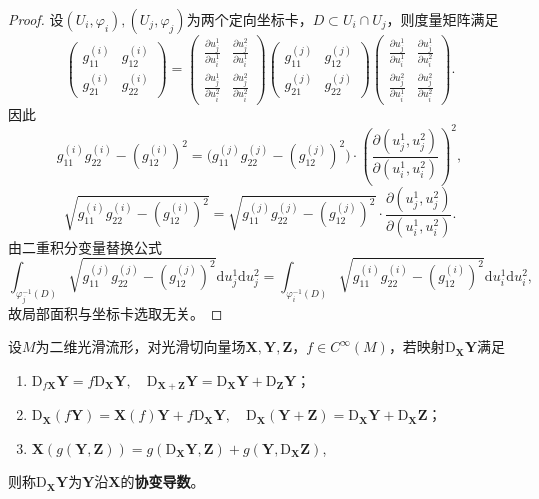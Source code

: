 \documentclass[../../main.tex]{subfiles}%
\begin{document}
\begin{proof}
设$(U_i,\varphi_i),(U_j,\varphi_j)$为两个定向坐标卡，$D\subset U_i\cap U_j$，则度量矩阵满足
\[
\begin{pmatrix}g_{11}^{(i)}&g_{12}^{(i)}\\g_{21}^{(i)}&g_{22}^{(i)}\end{pmatrix}
=\begin{pmatrix}\frac{\partial u_j^1}{\partial u_i^1}&\frac{\partial u_j^2}{\partial u_i^1}\\\frac{\partial u_j^1}{\partial u_i^2}&\frac{\partial u_j^2}{\partial u_i^2}\end{pmatrix}
\begin{pmatrix}g_{11}^{(j)}&g_{12}^{(j)}\\g_{21}^{(j)}&g_{22}^{(j)}\end{pmatrix}
\begin{pmatrix}\frac{\partial u_j^1}{\partial u_i^1}&\frac{\partial u_j^1}{\partial u_i^2}\\\frac{\partial u_j^2}{\partial u_i^1}&\frac{\partial u_j^2}{\partial u_i^2}\end{pmatrix}.
\]
因此
\[
g_{11}^{(i)}g_{22}^{(i)}-(g_{12}^{(i)})^2=\big(g_{11}^{(j)}g_{22}^{(j)}-(g_{12}^{(j)})^2\big)\cdot\left(\frac{\partial(u_j^1,u_j^2)}{\partial(u_i^1,u_i^2)}\right)^2,
\]
\[
\sqrt{g_{11}^{(i)}g_{22}^{(i)}-(g_{12}^{(i)})^2}=\sqrt{g_{11}^{(j)}g_{22}^{(j)}-(g_{12}^{(j)})^2}\cdot\frac{\partial(u_j^1,u_j^2)}{\partial(u_i^1,u_i^2)}.
\]
由二重积分变量替换公式
\[
\int_{\varphi_j^{-1}(D)}\sqrt{g_{11}^{(j)}g_{22}^{(j)}-(g_{12}^{(j)})^2}\mathrm{d}u_j^1\mathrm{d}u_j^2
=\int_{\varphi_i^{-1}(D)}\sqrt{g_{11}^{(i)}g_{22}^{(i)}-(g_{12}^{(i)})^2}\mathrm{d}u_i^1\mathrm{d}u_i^2,
\]
故局部面积与坐标卡选取无关。
\end{proof}

\begin{definition}
设$M$为二维光滑流形，对光滑切向量场$\boldsymbol{X},\boldsymbol{Y},\boldsymbol{Z}$，$f\in C^\infty(M)$，若映射$\mathrm{D}_{\boldsymbol{X}}\boldsymbol{Y}$满足
\begin{enumerate}[(1)]
\item $\mathrm{D}_{f\boldsymbol{X}}\boldsymbol{Y}=f\mathrm{D}_{\boldsymbol{X}}\boldsymbol{Y},\quad \mathrm{D}_{\boldsymbol{X}+\boldsymbol{Z}}\boldsymbol{Y}=\mathrm{D}_{\boldsymbol{X}}\boldsymbol{Y}+\mathrm{D}_{\boldsymbol{Z}}\boldsymbol{Y}$；
\item $\mathrm{D}_{\boldsymbol{X}}(f\boldsymbol{Y})=\boldsymbol{X}(f)\boldsymbol{Y}+f\mathrm{D}_{\boldsymbol{X}}\boldsymbol{Y},\quad \mathrm{D}_{\boldsymbol{X}}(\boldsymbol{Y}+\boldsymbol{Z})=\mathrm{D}_{\boldsymbol{X}}\boldsymbol{Y}+\mathrm{D}_{\boldsymbol{X}}\boldsymbol{Z}$；
\item $\boldsymbol{X}(g(\boldsymbol{Y},\boldsymbol{Z}))=g(\mathrm{D}_{\boldsymbol{X}}\boldsymbol{Y},\boldsymbol{Z})+g(\boldsymbol{Y},\mathrm{D}_{\boldsymbol{X}}\boldsymbol{Z})$,
\end{enumerate}
则称$\mathrm{D}_{\boldsymbol{X}}\boldsymbol{Y}$为$\boldsymbol{Y}$沿$\boldsymbol{X}$的\textbf{协变导数}。
\end{definition}
\end{document}
